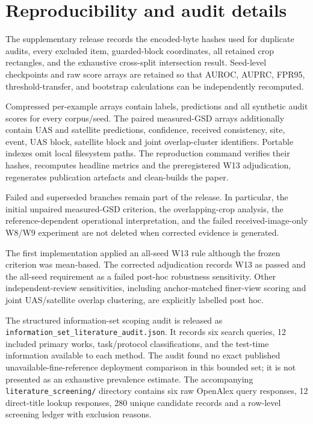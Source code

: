 \section{Reproducibility and audit details}

The supplementary release records the encoded-byte hashes used for duplicate
audits, every excluded item, guarded-block coordinates, all retained crop
rectangles, and the exhaustive cross-split intersection result. Seed-level
checkpoints and raw score arrays are retained so that AUROC, AUPRC, FPR95,
threshold-transfer, and bootstrap calculations can be independently
recomputed.

Compressed per-example arrays contain labels, predictions and all synthetic
audit scores for every corpus/seed. The paired measured-GSD arrays additionally
contain UAS and satellite predictions, confidence, received consistency, site,
event, UAS block, satellite block and joint overlap-cluster identifiers.
Portable indexes omit local filesystem paths. The reproduction command verifies
their hashes, recomputes headline metrics and the preregistered W13
adjudication, regenerates publication artefacts and clean-builds the paper.

Failed and superseded branches remain part of the release. In particular, the
initial unpaired measured-GSD criterion, the overlapping-crop analysis, the
reference-dependent operational interpretation, and the failed
received-image-only W8/W9 experiment are not deleted when corrected evidence is
generated.

The first implementation applied an all-seed W13 rule although the frozen
criterion was mean-based. The corrected adjudication records W13 as passed and
the all-seed requirement as a failed post-hoc robustness sensitivity. Other
independent-review sensitivities, including anchor-matched finer-view scoring
and joint UAS/satellite overlap clustering, are explicitly labelled post hoc.

The structured information-set scoping audit is released as
\texttt{information\_set\_literature\_audit.json}. It records six search
queries, 12 included primary works, task/protocol classifications, and the
test-time information available to each method. The audit found no exact
published unavailable-fine-reference deployment comparison in this bounded
set; it is not presented as an exhaustive prevalence estimate.
The accompanying \texttt{literature\_screening/} directory contains six raw
OpenAlex query responses, 12 direct-title lookup responses, 280 unique
candidate records and a row-level screening ledger with exclusion reasons.
